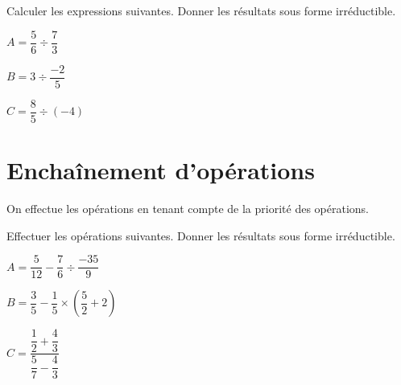 \documentclass[a4paper]{book}
\begin{document}
   
    \begin{exemple} 
        Calculer les expressions suivantes. Donner les résultats sous forme irréductible.

        \begin{minipage}{0.3\linewidth}
            $A=\dfrac{5}{6}\div\dfrac{7}{3}$

            \vspace{1.5cm}
        \end{minipage}
        \hfill\vline\hfill
        \begin{minipage}{0.3\linewidth}
            $B=3\div\dfrac{-2}{5}$

            \vspace{1.5cm}
        \end{minipage}
        \hfill\vline\hfill
        \begin{minipage}{0.3\linewidth}
            $C=\dfrac{8}{5}\div(-4)$

            \vspace{1.5cm}
        \end{minipage}
    \end{exemple}
    
    
\section{Enchaînement d'opérations}
    
    On effectue les opérations en tenant compte de la priorité des opérations.
    
    \begin{exemple} 
        Effectuer les opérations suivantes. Donner les résultats sous forme irréductible.

        \begin{minipage}{0.3\linewidth}
            $A=\dfrac{5}{12} - \dfrac{7}{6}\div \dfrac{-35}{9}$

            \vspace{2cm}
        \end{minipage}
        \hfill\vline\hfill
        \begin{minipage}{0.3\linewidth}
            $B=\dfrac{3}{5} - \dfrac{1}{5} \times \left( \dfrac{5}{2} + 2 \right)$

            \vspace{2cm}
        \end{minipage}
        \hfill\vline\hfill
        \begin{minipage}{0.3\linewidth}
            $C=\dfrac{\dfrac{1}{2} + \dfrac{4}{3}}{\dfrac{5}{7} - \dfrac{4}{3}}$

            \vspace{1.5cm}
        \end{minipage}
    \end{exemple}
\end{document}
